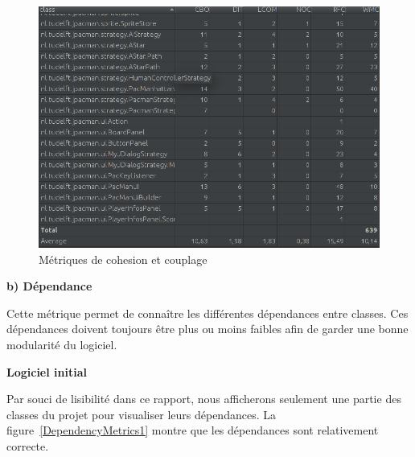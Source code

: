 \documentclass[12pt, openany]{report}
\begin{document}
\begin{figure}[!h]
	\centering
	\includegraphics[scale=0.6]{Images/MetricsCohesion2.png} 
	\caption{Métriques de cohesion et couplage}
	\label{MetricsCohesion2}
\end{figure}

\newpage
\textbf{b) Dépendance}


Cette métrique permet de connaître les différentes dépendances entre classes. Ces dépendances doivent toujours être plus ou moins faibles afin de garder une bonne modularité du logiciel.

\textbf{Logiciel initial}

Par souci de lisibilité dans ce rapport, nous afficherons seulement une partie des classes du projet pour visualiser leurs dépendances. La figure~\ref{DependencyMetrics1} montre que les dépendances sont relativement correcte.
\end{document}
